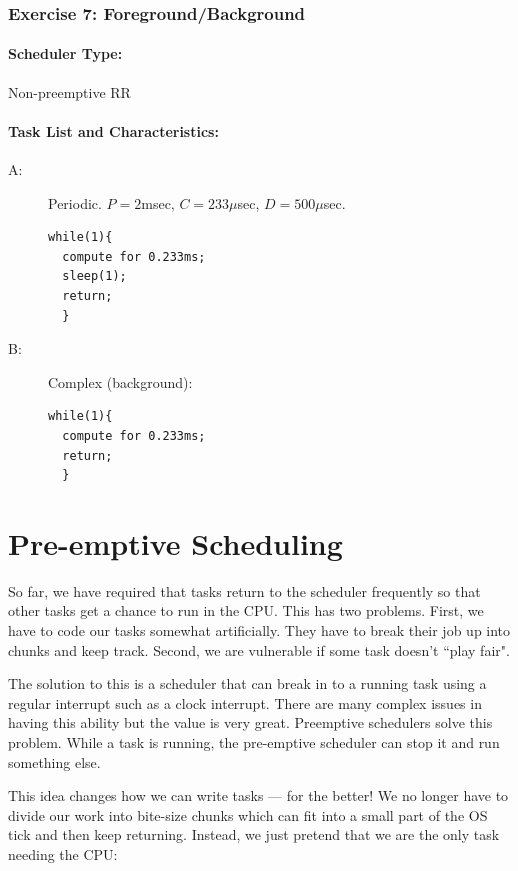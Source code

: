 \documentclass{article}	%
\begin{document}
\subsubsection{Exercise 7: Foreground/Background}
\paragraph{Scheduler Type:} Non-preemptive RR
\paragraph{Task List and Characteristics:}
\begin{description} 
                \item[A:] Periodic.  $P = 2$msec, $C = 233\mu$sec,
                           $D =500\mu$sec.
\begin{verbatim}
while(1){
  compute for 0.233ms;
  sleep(1);
  return;
  }
\end{verbatim}
                \item[B:] Complex (background): 
\begin{verbatim}
while(1){
  compute for 0.233ms;
  return;
  }
\end{verbatim}

\end{description} 





\section{Pre-emptive Scheduling}

So far, we have required that tasks return to the scheduler frequently
so that other tasks get a chance to run in the CPU.  This has two
problems.  First, we have to code our tasks somewhat artificially.  They
have to break their job up into chunks and keep track.  Second, we are
vulnerable if some task doesn't ``play fair".

The solution to this is a scheduler that can break in to a running task
using a regular interrupt such as a clock interrupt.   There are many
complex issues in having this ability but the value is very great.
Preemptive schedulers solve this problem.  While a task is running, 
the pre-emptive scheduler can stop it and run something else.

This idea changes how we can write tasks --- for the better! We no longer have to divide our work into bite-size chunks which can fit into a small part of the OS tick and then keep returning.  Instead, we just pretend that we are the only task needing the CPU:
\end{document}
